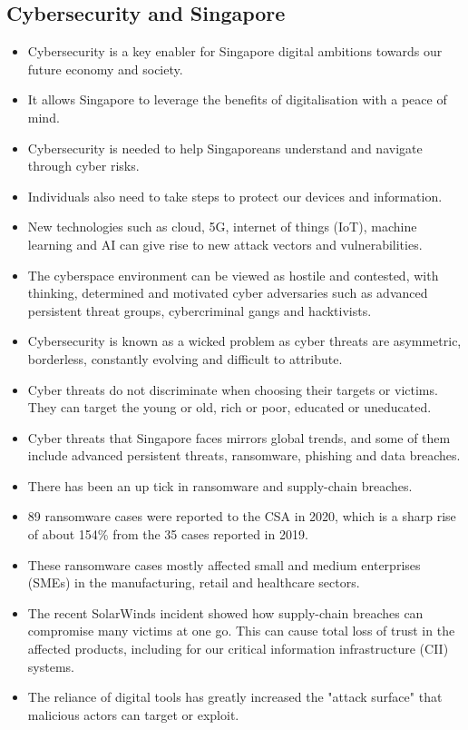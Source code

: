 \documentclass[11pt]{article}
\begin{document}
\subsection{Cybersecurity and Singapore}
\label{sec:orgde12e39}
\begin{itemize}
\item Cybersecurity is a key enabler for Singapore digital ambitions towards our future economy and society.
\item It allows Singapore to leverage the benefits of digitalisation with a peace of mind.
\item Cybersecurity is needed to help Singaporeans understand and navigate through cyber risks.
\item Individuals also need to take steps to protect our devices and information.
\item New technologies such as cloud, 5G, internet of things (IoT), machine learning and AI can give rise to new attack vectors and vulnerabilities.
\item The cyberspace environment can be viewed as hostile and contested, with thinking, determined and motivated cyber adversaries such as advanced persistent threat groups, cybercriminal gangs and hacktivists.
\item Cybersecurity is known as a wicked problem as cyber threats are asymmetric, borderless, constantly evolving and difficult to attribute.
\item Cyber threats do not discriminate when choosing their targets or victims. They can target the young or old, rich or poor, educated or uneducated.
\item Cyber threats that Singapore faces mirrors global trends, and some of them include advanced persistent threats, ransomware, phishing and data breaches.
\item There has been an up tick in ransomware and supply-chain breaches.
\item 89 ransomware cases were reported to the CSA in 2020, which is a sharp rise of about 154\% from the 35 cases reported in 2019.
\item These ransomware cases mostly affected small and medium enterprises (SMEs) in the manufacturing, retail and healthcare sectors.
\item The recent SolarWinds incident showed how supply-chain breaches can compromise many victims at one go. This can cause total loss of trust in the affected products, including for our critical information infrastructure (CII) systems.
\item The reliance of digital tools has greatly increased the "attack surface" that malicious actors can target or exploit.
\end{itemize}
\end{document}

